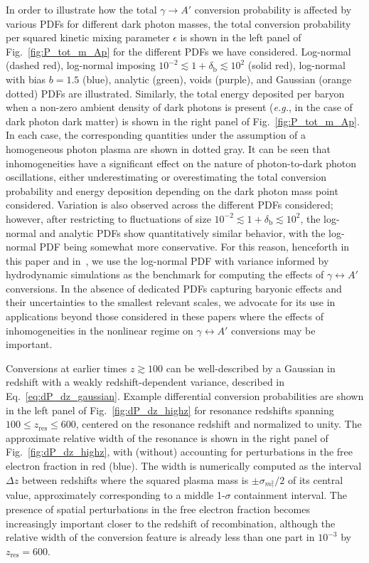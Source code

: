 \documentclass[prd,aps,10pt,nofootinbib,twocolumn,superscriptaddress,preprintnumbers,balancelastpage,longbibliography]{revtex4-1}
\begin{document}
In order to illustrate how the total $\gamma \rightarrow A'$ conversion probability is affected by various PDFs for different dark photon masses, the total conversion probability per squared kinetic mixing parameter $\epsilon$ is shown in the left panel of Fig.~\ref{fig:P_tot_m_Ap} for the different PDFs we have considered. Log-normal (dashed red), log-normal imposing $10^{-2} \lesssim 1 + \delta_\text{b} \lesssim 10^2$ (solid red), log-normal with bias $b=1.5$ (blue), analytic (green), voids (purple), and Gaussian (orange dotted) PDFs are illustrated. Similarly, the total energy deposited per baryon when a non-zero ambient density of dark photons is present (\emph{e.g.}, in the case of dark photon dark matter) is shown in the right panel of Fig.~\ref{fig:P_tot_m_Ap}. In each case, the corresponding quantities under the assumption of a homogeneous photon plasma are shown in dotted gray. It can be seen that inhomogeneities have a significant effect on the nature of photon-to-dark photon oscillations, either underestimating or overestimating the total conversion probability and energy deposition depending on the dark photon mass point considered. Variation is also observed across the different PDFs considered; however, after restricting to fluctuations of size $10^{-2} \lesssim 1 + \delta_\text{b} \lesssim 10^2$, the log-normal and analytic PDFs show quantitatively similar behavior, with the log-normal PDF being somewhat more conservative. For this reason, henceforth in this paper and in~, we use the log-normal PDF with variance informed by hydrodynamic simulations as the benchmark for computing the effects of $\gamma\leftrightarrow A'$ conversions. In the absence of dedicated PDFs capturing baryonic effects and their uncertainties to the smallest relevant scales, we advocate for its use in applications beyond those considered in these papers where the effects of inhomogeneities in the nonlinear regime on $\gamma\leftrightarrow A'$ conversions may be important.

Conversions at earlier times $z\gtrsim 100$ can be well-described by a Gaussian in redshift with a weakly redshift-dependent variance, described in Eq.~\eqref{eq:dP_dz_gaussian}. Example differential conversion probabilities are shown in the left panel of Fig.~\ref{fig:dP_dz_highz} for resonance redshifts spanning $100 \leq z_\mathrm{res} \leq 600$, centered on the resonance redshift and normalized to unity. The approximate relative width of the resonance is shown in the right panel of Fig.~\ref{fig:dP_dz_highz}, with (without) accounting for perturbations in the free electron fraction in red (blue). The width is numerically computed as the interval $\Delta z$ between redshifts where the squared plasma mass is $\pm \sigma_{m_\gamma^2}/2$ of its central value, approximately corresponding to a middle 1-$\sigma$ containment interval. The presence of spatial perturbations in the free electron fraction becomes increasingly important closer to the redshift of recombination, although the relative width of the conversion feature is already less than one part in $10^{-3}$ by $z_\mathrm{res} = 600$.
\end{document}
